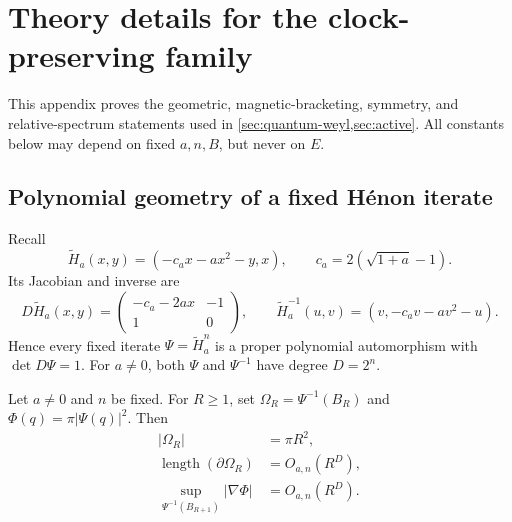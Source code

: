 \section{Theory details for the clock-preserving family}
\label{app:theory}

This appendix proves the geometric, magnetic-bracketing, symmetry, and
relative-spectrum statements used in \cref{sec:quantum-weyl,sec:active}.
All constants below may depend on fixed \(a,n,B\), but never on \(E\).

\subsection{Polynomial geometry of a fixed H\'enon iterate}
\label{app:poly-geometry}

Recall
\begin{equation}
 \widetilde H_a(x,y)=(-c_ax-ax^2-y,x),
 \qquad c_a=2(\sqrt{1+a}-1).
 \label{eq:app-centered-map}
\end{equation}
Its Jacobian and inverse are
\begin{equation}
 D\widetilde H_a(x,y)=
 \begin{pmatrix}-c_a-2ax&-1\\1&0\end{pmatrix},
 \qquad
 \widetilde H_a^{-1}(u,v)=(v,-c_av-av^2-u).
 \label{eq:app-centered-inverse}
\end{equation}
Hence every fixed iterate
\(\Psi=\widetilde H_a^n\) is a proper polynomial automorphism with
\(\det D\Psi=1\).  For \(a\neq0\), both \(\Psi\) and \(\Psi^{-1}\) have
degree \(D=2^n\).

\begin{lemma}
\label{lem:allowed-domain-geometry}
Let \(a\neq0\) and \(n\) be fixed.  For \(R\geq1\), set
\(\Omega_R=\Psi^{-1}(B_R)\) and
\(\Phi(q)=\pi|\Psi(q)|^2\).  Then
\begin{align}
 |\Omega_R|&=\pi R^2, \\
 \operatorname{length}(\partial\Omega_R)&=O_{a,n}(R^D),
 \label{eq:app-boundary-length}\\
 \sup_{\Psi^{-1}(B_{R+1})}|\nabla\Phi|&=O_{a,n}(R^D).
 \label{eq:app-gradient-bound}
\end{align}
\end{lemma}

